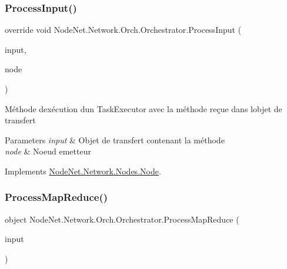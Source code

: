 \subsubsection{\texorpdfstring{Process\+Input()}{ProcessInput()}}
{\footnotesize\ttfamily override void Node\+Net.\+Network.\+Orch.\+Orchestrator.\+Process\+Input (\begin{DoxyParamCaption}\item[{\hyperlink{class_node_net_1_1_data_1_1_data_input}{Data\+Input}}]{input,  }\item[{\hyperlink{class_node_net_1_1_network_1_1_nodes_1_1_node}{Node}}]{node }\end{DoxyParamCaption})\hspace{0.3cm}{\ttfamily [virtual]}}



Méthode d\textquotesingle{}exécution d\textquotesingle{}un Task\+Executor avec la méthode reçue dans l\textquotesingle{}objet de transfert 


\begin{DoxyParams}{Parameters}
{\em input} & Objet de transfert contenant la méthode\\
\hline
{\em node} & Noeud emetteur\\
\hline
\end{DoxyParams}


Implements \hyperlink{class_node_net_1_1_network_1_1_nodes_1_1_node_a953dce3f4779355cd3bf542ac6d1d3d8}{Node\+Net.\+Network.\+Nodes.\+Node}.

\mbox{\label{class_node_net_1_1_network_1_1_orch_1_1_orchestrator_ab0bdae10fc319c1ab9bc2fa5b89474d2}} 
\subsubsection{\texorpdfstring{Process\+Map\+Reduce()}{ProcessMapReduce()}}
{\footnotesize\ttfamily object Node\+Net.\+Network.\+Orch.\+Orchestrator.\+Process\+Map\+Reduce (\begin{DoxyParamCaption}\item[{\hyperlink{class_node_net_1_1_data_1_1_data_input}{Data\+Input}}]{input }\end{DoxyParamCaption})\hspace{0.3cm}{\ttfamily [protected]}}



